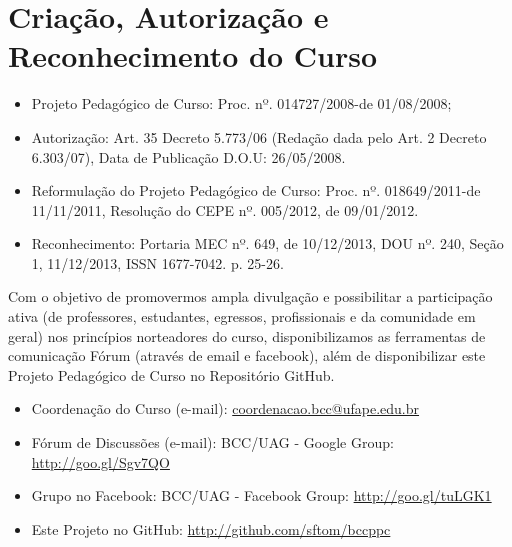 
\chapter*[Criação, Autorização e Reconhecimento do Curso]{Criação, Autorização e Reconhecimento do Curso}

\begin{itemize}
  \item Projeto Pedagógico de Curso: Proc. nº. 014727/2008-de 01/08/2008;
  \item Autorização: Art. 35 Decreto 5.773/06 (Redação dada pelo Art. 2 Decreto 6.303/07), Data de Publicação D.O.U: 26/05/2008.
  \item Reformulação do Projeto Pedagógico de Curso: Proc. nº. 018649/2011-de 11/11/2011, Resolução do CEPE nº. 005/2012, de 09/01/2012.
  \item Reconhecimento: Portaria MEC nº. 649, de 10/12/2013, DOU nº. 240, Seção 1, 11/12/2013, ISSN 1677-7042. p. 25-26.
\end{itemize}

Com o objetivo de promovermos ampla divulgação e possibilitar a participação ativa (de professores, estudantes, egressos, profissionais e da comunidade em geral) nos princípios norteadores do curso, disponibilizamos as ferramentas de comunicação Fórum (através de email e facebook), além de disponibilizar este Projeto Pedagógico de Curso no Repositório GitHub.

\begin{itemize}
  \item Coordenação do Curso (e-mail): \href{mailto:coordenacao.bcc@ufape.edu.br}{coordenacao.bcc@ufape.edu.br}
  \item Fórum de Discussões (e-mail): BCC/UAG - Google Group: \url{http://goo.gl/Sgv7QO}
  \item Grupo no Facebook: BCC/UAG - Facebook Group: \url{http://goo.gl/tuLGK1}
  \item Este Projeto no GitHub: \url{http://github.com/sftom/bccppc}
\end{itemize}

\newpage